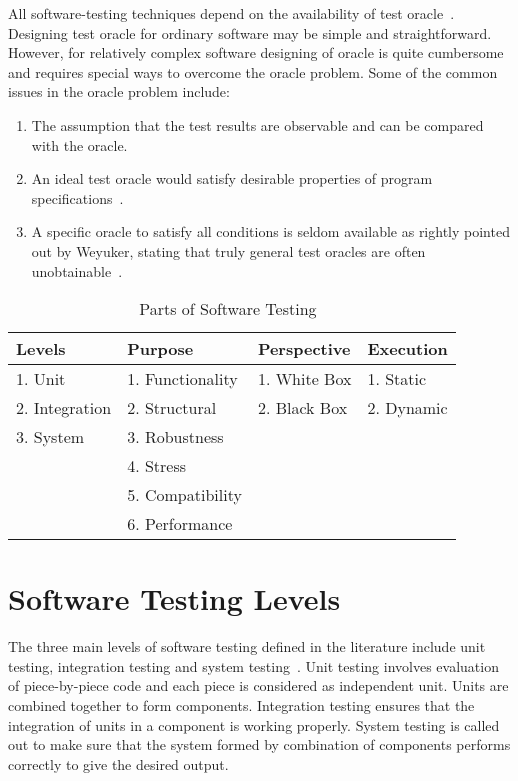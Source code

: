 \noindent All software-testing techniques depend on the availability of test oracle~\cite{gaudel2010software}. Designing test oracle for ordinary software may be simple and straightforward. However, for relatively complex software designing of oracle is quite cumbersome and requires special ways to overcome the oracle problem. Some of the common issues in the oracle problem include:
\begin{enumerate}
\item The assumption that the test results are observable and can be compared with the oracle.
\item An ideal test oracle would satisfy desirable properties of program specifications~\cite{baresi2001test}.
\item A specific oracle to satisfy all conditions is seldom available as rightly pointed out by Weyuker, stating that truly general test oracles are often unobtainable~\cite{weyuker1982testing}. 
\end{enumerate}


\begin{table}[ht]
\caption{Parts of Software Testing~\cite{adrion1982validation, chilenski1994applicability, gaudel2010software, richardson1992specification, tracey1998automated}} %
\smallskip
\centering %
\begin{tabular}{| l | l | l | l | } %
\hline

Levels 					&Purpose		 				& Perspective			& Execution 	\\
\hline
1. Unit					&1. Functionality		& 1. White Box		& 1. Static 	\\
2. Integration	&2. Structural			& 2. Black Box		& 2. Dynamic	\\
3. System				&3. Robustness			& 								&			\\
								&4. Stress					&									&			\\
								&5. Compatibility		&									&			\\
								&6. Performance			&									&			\\



\hline %
\end{tabular}
\bigskip
\label{table:addvalues} %
\end{table}


\section{Software Testing Levels}
The three main levels of software testing defined in the literature include unit testing, integration testing and system testing~\cite{chilenski1994applicability}. Unit testing involves evaluation of piece-by-piece code and each piece is considered as independent unit. Units are combined together to form components. Integration testing ensures that the integration of units in a component is working properly. System testing is called out to make sure that the system formed by combination of components performs correctly to give the desired output.

